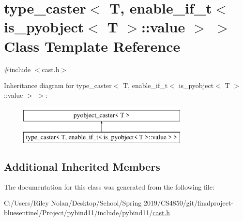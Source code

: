 \hypertarget{classtype__caster_3_01_t_00_01enable__if__t_3_01is__pyobject_3_01_t_01_4_1_1value_01_4_01_4}{}\section{type\+\_\+caster$<$ T, enable\+\_\+if\+\_\+t$<$ is\+\_\+pyobject$<$ T $>$\+::value $>$ $>$ Class Template Reference}
\label{classtype__caster_3_01_t_00_01enable__if__t_3_01is__pyobject_3_01_t_01_4_1_1value_01_4_01_4}


{\ttfamily \#include $<$cast.\+h$>$}

Inheritance diagram for type\+\_\+caster$<$ T, enable\+\_\+if\+\_\+t$<$ is\+\_\+pyobject$<$ T $>$\+::value $>$ $>$\+:\begin{figure}[H]
\begin{center}
\leavevmode
\includegraphics[height=2.000000cm]{classtype__caster_3_01_t_00_01enable__if__t_3_01is__pyobject_3_01_t_01_4_1_1value_01_4_01_4}
\end{center}
\end{figure}
\subsection*{Additional Inherited Members}


The documentation for this class was generated from the following file\+:\begin{DoxyCompactItemize}
\item 
C\+:/\+Users/\+Riley Nolan/\+Desktop/\+School/\+Spring 2019/\+C\+S4850/git/finalproject-\/bluesentinel/\+Project/pybind11/include/pybind11/\mbox{\hyperlink{cast_8h}{cast.\+h}}\end{DoxyCompactItemize}
